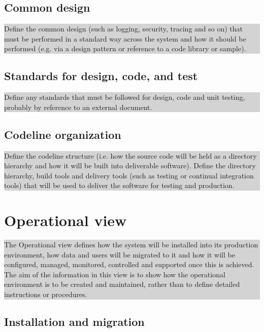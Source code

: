 \documentclass[a4paper,11pt]{report}
\newcommand{\instructions}[1]{
  \noindent\colorbox{lightgray}{%
    \parbox{\linewidth}{%
      #1
    }%
  }%
 \vspace{0.1cm}
}
\begin{document}
\subsection{Common design}
\label{sec:common-design}

\instructions{
Define the common design (such as logging, security, tracing and so
on) that must be performed in a standard way across the system and how
it should be performed (e.g. via a design pattern or reference to a
code library or sample).
}

\subsection{Standards for design, code, and test}
\label{sec:stand-design-code}

\instructions{
Define any standards that must be followed for design, code and unit
testing, probably by reference to an external document.
}

\subsection{Codeline organization}
\label{sec:codel-organ}

\instructions{
Define the codeline structure (i.e. how the source code will be held
as a directory hierarchy and how it will be built into deliverable
software). Define the directory hierarchy, build tools and delivery
tools (such as testing or continual integration tools) that will be
used to deliver the software for testing and production.
}

\section{Operational view}
\label{sec:operational-view}

\instructions{
The Operational view defines how the system will be installed into its
production environment, how data and users will be migrated to it and
how it will be configured, managed, monitored, controlled and
supported once this is achieved. The aim of the information in this
view is to show how the operational environment is to be created and
maintained, rather than to define detailed instructions or procedures.
}
\subsection{Installation and migration}
\label{sec:inst-migr}
\end{document}
